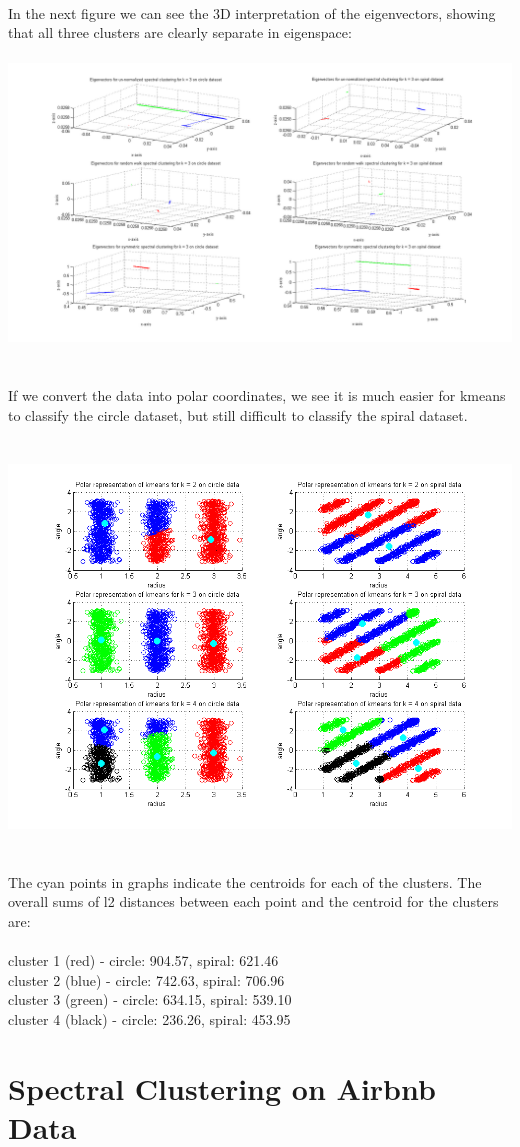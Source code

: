 \documentclass[paper=a4, fontsize=11pt]{scrartcl} %
\numberwithin{equation}{section} %
\numberwithin{figure}{section} %
\numberwithin{table}{section} %
\begin{document}
	\\\\\\
	In the next figure we can see the 3D interpretation of the eigenvectors, showing that all three clusters are clearly separate in eigenspace:
	\\\\
	\hspace*{-4.3cm}\includegraphics[scale=0.55]{3dplots}
	\\\\\\
	If we convert the data into polar coordinates, we see it is much easier for kmeans to classify the circle dataset, but still difficult to classify the spiral dataset.
	\\\\\\
	\hspace*{-3cm}\includegraphics[scale=0.8]{polar_kmeans}
	\\\\\\
	The cyan points in graphs indicate the centroids for each of the clusters. The overall sums of l2 distances between each point and the centroid for the clusters are:
	\\\\
	cluster 1 (red) - circle: 904.57, spiral: 621.46\\
	cluster 2 (blue) - circle: 742.63, spiral: 706.96\\
	cluster 3 (green) - circle: 634.15, spiral: 539.10\\
	cluster 4 (black) - circle: 236.26, spiral: 453.95
	
	\newpage
	\section{Spectral Clustering on Airbnb Data}

	
\end{document}
